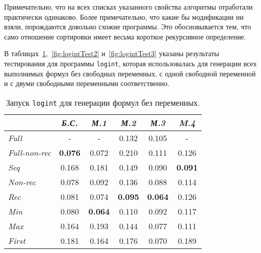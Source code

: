 Примечательно, что на всех списках указанного свойства алгоритмы отработали практически
одинаково. Более примечательно, что какие бы модификации ни взяли,
порождаются довольно схожие программы. Это обосновывается тем, что само отношение
сортировки имеет весьма короткое рекурсивное определение.

В таблицах~\ref{fig:logintTest1},~\ref{fig:logintTest2} и~\ref{fig:logintTest3} указаны результаты тестирования для
программы \lstinline{logint}, которая использовалась для генерации всех выполнимых формул
без свободных переменных, с одной свободной переменной и с двуми свободными переменными соответственно.

\begin{table}[h!]
\center
\begin{tabular}{|l|c|c|c|c|c|}
\hline
   &{\it Б.С.}&{\it М.1}&{\it М.2}&{\it М.3}&{\it M.4} \\ \hline
{\it Full        } &    -        &    -         & 0.132      &  0.105       &    -   \\ \hline
{\it Full-non-rec} & {\bf 0.076} & 0.072       & 0.210       &  0.111       & 0.126 \\ \hline
{\it Seq         } & 0.168       & 0.181       & 0.149       &  0.090       & {\bf 0.091} \\ \hline
{\it Non-rec     } & 0.078       & 0.092       & 0.136       &  0.088       & 0.114 \\ \hline
{\it Rec         } & 0.081       & 0.074       & {\bf 0.095} &  {\bf 0.064} & 0.126 \\ \hline
{\it Min         } & 0.080       & {\bf 0.064} & 0.110      &  0.092       & 0.117 \\ \hline
{\it Max         } & 0.164       & 0.193       & 0.144       &  0.077       & 0.111 \\ \hline
{\it First       } & 0.181       & 0.164       & 0.176       &  0.070       & 0.189 \\ \hline
\end{tabular}
\caption{Запуск \lstinline{logint} для генерации формул без переменных.}
\label{fig:logintTest1}
\end{table}

